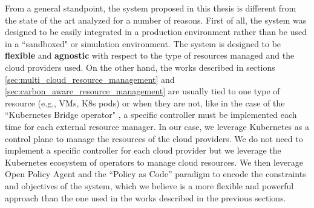 From a general standpoint, the system proposed in this thesis is different from the state of the art analyzed for a number of reasons.
First of all, the system was designed to be easily integrated in a production environment rather than be used in a ``sandboxed" or simulation environment.
The system is designed to be \textbf{flexible} and \textbf{agnostic} with respect to the type of resources managed and the cloud providers used.
On the other hand, the works described in sections \ref{sec:multi_cloud_resource_management} and  \ref{sec:carbon_aware_resource_management} are usually tied to one type of resource (e.g., VMs, K8s pods) or when they are not, like in the case of the ``Kubernetes Bridge operator" \cite{lublinsky2022kubernetesbridgeoperatorcloud}, a specific controller must be implemented each time for each external resource manager.
In our case, we leverage Kubernetes as a control plane to manage the resources of the cloud providers.
We do not need to implement a specific controller for each cloud provider but we leverage the Kubernetes ecosystem of operators to manage cloud resources.
We then leverage Open Policy Agent and the ``Policy as Code'' paradigm to encode the constraints and objectives of the system, which we believe is a more flexible and powerful approach than the one used in the works described in the previous sections.

\newpage
